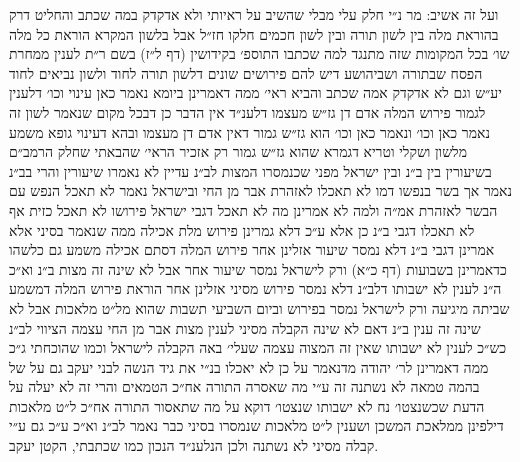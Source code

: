 \documentclass[12pt, openany]{book}
\begin{document}
\begin{multicols}{2}
ועל זה אשיב: מר נ״י חלק עלי מבלי שהשיב על ראיותי ולא אדקדק במה שכתב והחליט דרק בהוראת מלה בין לשון תורה ובין לשון חכמים חלקו חז״ל אבל בלשון המקרא הוראת כל מלה שו׳ בכל המקומות שזה מתנגד למה שכתבו התוספ׳ בקידושין (דף ל״ז) בשם ר״ת לענין ממחרת הפסח שבתורה ושביהושע דיש להם פירושים שונים דלשון תורה לחוד ולשון נביאים לחוד יע״ש וגם לא אדקדק אמה שכתב והביא ראי׳ ממה דאמרינן ביומא נאמר כאן עינוי וכו׳ דלענין לגמור פירוש המלה אדם דן גז״ש מעצמו דלענ״ד אין הדבר כן דבכל מקום שנאמר לשון זה נאמר כאן וכו׳ ונאמר כאן וכו׳ הוא גז״ש גמור דאין אדם דן מעצמו ובהא דעינוי גופא משמע מלשון ושקלי וטריא דגמרא שהוא גז״ש גמור רק אזכיר הראי׳ שהבאתי שחלק הרמב״ם בשיעורין בין ב״נ ובין ישראל מפני שכנמסרו המצות לב״נ עדיין לא נאמרו שיעורין והרי בב״נ נאמר אך בשר בנפשו דמו לא תאכלו לאזהרת אבר מן החי ובישראל נאמר לא תאכל הנפש עם הבשר לאזהרת אמ״ה ולמה לא אמרינן מה לא תאכל דגבי ישראל פירושו לא תאכל כזית אף לא תאכלו דגבי ב״נ כן אלא ע״כ דלא גמרינן פירוש מלת אכילה ממה שנאמר בסיני אלא אמרינן דגבי ב״נ דלא נמסר שיעור אזלינן אחר פירוש המלה דסתם אכילה משמע גם כלשהו כדאמרינן בשבועות (דף כ״א) ורק לישראל נמסר שיעור אחר אבל לא שינה זה מצות ב״נ וא״כ ה״נ לענין לא ישבותו דלב״נ דלא נמסר פירוש מסיני אזלינן אחר הוראת פירוש המלה דמשמע שביתה מיגיעה ורק לישראל נמסר בפירוש וביום השביעי תשבות שהוא מל״ט מלאכות אבל לא שינה זה ענין ב״נ דאם לא שינה הקבלה מסיני לענין מצות אבר מן החי עצמה הציווי לב״נ כש״כ לענין לא ישבותו שאין זה המצוה עצמה שעלי׳ באה הקבלה לישראל וכמו שהוכחתי ג״כ ממה דאמרינן לר׳ יהודה מדנאמר על כן לא יאכלו בנ״י את גיד הנשה לבני יעקב גם על של בהמה טמאה לא נשתנה זה ע״י מה שאסרה התורה אח״כ הטמאים והרי זה לא יעלה על הדעת שכשנצטו׳ נח לא ישבותו שנצטו׳ דוקא על מה שתאסור התורה אח״כ ל״ט מלאכות דילפינן ממלאכת המשכן ושענין ל״ט מלאכות שנמסרו בסיני כבר נאמר לב״נ וא״כ ע״כ גם ע״י קבלה מסיני לא נשתנה ולכן הנלענ״ד הנכון כמו שכתבתי, הקטן יעקב.\\\vspace{0pt}

\end{multicols}\newpage
\end{document}

